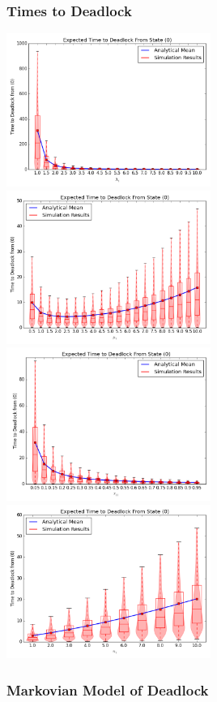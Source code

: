 \documentclass[xcolor={table}]{beamer}
\begin{document}
\begin{frame}
    \frametitle{Times to Deadlock}
    \includegraphics[width=0.5\textwidth]{varyL1_1node}
    \includegraphics[width=0.5\textwidth]{varymu1_1node}\newline
    \includegraphics[width=0.5\textwidth]{varyr11_1node}
    \includegraphics[width=0.5\textwidth]{varyn1_1node}
\end{frame}



\begin{frame}
    \frametitle{Markovian Model of Deadlock}
    \newline
\end{frame}
\end{document}
